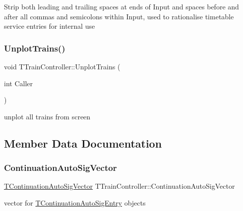 Strip both leading and trailing spaces at ends of Input and spaces before and after all commas and semicolons within Input, used to rationalise timetable service entries for internal use \mbox{\label{class_t_train_controller_a7e2abfcc38e51933883d959c4155aca0}} 
\subsubsection{\texorpdfstring{Unplot\+Trains()}{UnplotTrains()}}
{\footnotesize\ttfamily void T\+Train\+Controller\+::\+Unplot\+Trains (\begin{DoxyParamCaption}\item[{int}]{Caller }\end{DoxyParamCaption})}

unplot all trains from screen 

\subsection{Member Data Documentation}
\mbox{\label{class_t_train_controller_a0b412f7b88f829632e54bffc0659ac3b}} 
\subsubsection{\texorpdfstring{Continuation\+Auto\+Sig\+Vector}{ContinuationAutoSigVector}}
{\footnotesize\ttfamily \mbox{\hyperlink{class_t_train_controller_a1908f7d1a5dcfebf2f747efbdd6f4681}{T\+Continuation\+Auto\+Sig\+Vector}} T\+Train\+Controller\+::\+Continuation\+Auto\+Sig\+Vector}

vector for \mbox{\hyperlink{class_t_train_controller_1_1_t_continuation_auto_sig_entry}{T\+Continuation\+Auto\+Sig\+Entry}} objects \mbox{\label{class_t_train_controller_a7d7dc55374ee043f1045b1d4ff91853f}} 
